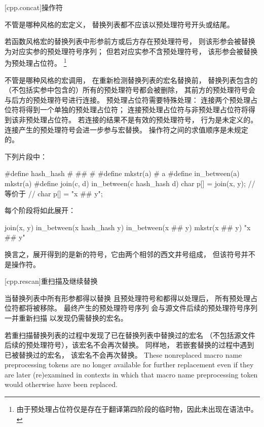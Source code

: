 [cpp.concat]{\tcode{\#\#}操作符}%
%

\pnum
不管是哪种风格的宏定义，
替换列表都不应该以预处理符号\tcode{\#\#}开头或结尾。

\pnum
若函数风格宏的替换列表中形参前方或后方存在预处理符号\tcode{\#\#}，
则该形参会被替换为对应实参的预处理符号序列；
但若对应实参不含预处理符号，
该形参会被替换为预处理占位符。
\footnote{由于预处理占位符仅是存在于翻译第四阶段的临时物，因此未出现在语法中。}

\pnum
不管是哪种风格的宏调用，
在重新检测替换列表的宏名替换前，
替换列表包含的（不包括实参中包含的）所有的\tcode{\#\#}预处理符号都会被删除，
其前方的预处理符号会与后方的预处理符号进行连接。
预处理占位符需要特殊处理：
连接两个预处理占位符将得到一个单独的预处理占位符；
连接预处理占位符与非预处理占位符将得到该非预处理占位符。
若连接的结果不是有效的预处理符号，
行为是未定义的。
连接产生的预处理符号会进一步参与宏替换。
\tcode{\#\#}操作符之间的求值顺序是未规定的。

\enterexample 下列片段中：

\begin{codeblock}
#define hash_hash # ## #
#define mkstr(a) # a
#define in_between(a) mkstr(a)
#define join(c, d) in_between(c hash_hash d)
char p[] = join(x, y);          // 等价于
                                // char p[] = "x \#\# y";
\end{codeblock}

每个阶段将如此展开：

\begin{codeblock}
join(x, y)
in_between(x hash_hash y)
in_between(x ## y)
mkstr(x ## y)
"x ## y"
\end{codeblock}

换言之，展开得到的是新的符号，它由两个相邻的西文井号组成，
但该符号并不是\tcode{\#\#}操作符。\exitexample

[cpp.rescan]{重扫描及继续替换}%
%

\pnum
当替换列表中所有形参都得以替换
且预处理符号\tcode{\#}和\tcode{\#\#}都得以处理后，
所有预处理占位符都将被移除。
最终产生的预处理符号序列
会与源文件后续的预处理符号序列一并重新扫描
以发现仍需替换的宏名。

\pnum
若重扫描替换列表的过程中发现了已在替换列表中替换过的宏名
（不包括源文件后续的预处理符号），该宏名不会再次替换。
同样地，
若嵌套替换的过程中遇到已被替换过的宏名，
该宏名不会再次替换。
These nonreplaced macro name preprocessing tokens are no longer available
for further replacement even if they are later (re)examined in contexts
in which that macro name preprocessing token would otherwise have been
replaced.

